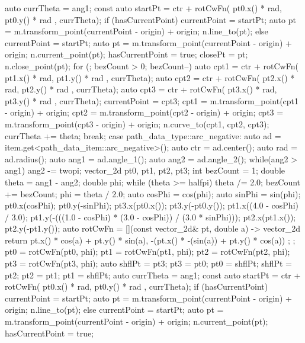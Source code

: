 \begin{codeblock}
{{{    auto currTheta = ang1;
    const auto startPt =
      ctr + rotCwFn({ pt0.x() * rad, pt0.y() * rad }, currTheta);
    if (hasCurrentPoint) {
      currentPoint = startPt;
      auto pt = m.transform_point(currentPoint - origin) + origin;
      n.line_to(pt);
    }
    else {
      currentPoint = startPt;
      auto pt = m.transform_point(currentPoint - origin) + origin;
      n.current_point(pt);
      hasCurrentPoint = true;
      closePt = pt;
      n.close_point(pt);
    }
    for (; bezCount > 0; bezCount--) {
      auto cpt1 = ctr + rotCwFn({ pt1.x() * rad, pt1.y() * rad }, currTheta);
      auto cpt2 = ctr + rotCwFn({ pt2.x() * rad, pt2.y() * rad }, currTheta);
      auto cpt3 = ctr + rotCwFn({ pt3.x() * rad, pt3.y() * rad }, currTheta);
      currentPoint = cpt3;
      cpt1 = m.transform_point(cpt1 - origin) + origin;
      cpt2 = m.transform_point(cpt2 - origin) + origin;
      cpt3 = m.transform_point(cpt3 - origin) + origin;
      n.curve_to(cpt1, cpt2, cpt3);
      currTheta += theta;
    }
  } break;
  case path_data_type::arc_negative:
  {
    auto ad = item.get<path_data_item::arc_negative>();
    auto ctr = ad.center();
    auto rad = ad.radius();
    auto ang1 = ad.angle_1();
    auto ang2 = ad.angle_2();
    while(ang2 > ang1) {
      ang2 -= twopi;
    }
    vector_2d pt0, pt1, pt2, pt3;
    int bezCount = 1;
    double theta = ang1 - ang2;
    double phi;
    while (theta >= halfpi) {
      theta /= 2.0;
      bezCount += bezCount;
    }
    phi = theta / 2.0;
    auto cosPhi = cos(phi);
    auto sinPhi = sin(phi);
    pt0.x(cosPhi);
    pt0.y(-sinPhi);
    pt3.x(pt0.x());
    pt3.y(-pt0.y());
    pt1.x((4.0 - cosPhi) / 3.0);
    pt1.y(-(((1.0 - cosPhi) * (3.0 - cosPhi)) / (3.0 * sinPhi)));
    pt2.x(pt1.x());
    pt2.y(-pt1.y());
    auto rotCwFn = [](const vector_2d& pt, double a) -> vector_2d {
      return { pt.x() * cos(a) + pt.y() * sin(a),
        -(pt.x() * -(sin(a)) + pt.y() * cos(a)) };
    };
    pt0 = rotCwFn(pt0, phi);
    pt1 = rotCwFn(pt1, phi);
    pt2 = rotCwFn(pt2, phi);
    pt3 = rotCwFn(pt3, phi);
    auto shflPt = pt3;
    pt3 = pt0;
    pt0 = shflPt;
    shflPt = pt2;
    pt2 = pt1;
    pt1 = shflPt;
    auto currTheta = ang1;
    const auto startPt =
      ctr + rotCwFn({ pt0.x() * rad, pt0.y() * rad }, currTheta);
    if (hasCurrentPoint) {
      currentPoint = startPt;
      auto pt = m.transform_point(currentPoint - origin) + origin;
      n.line_to(pt);
    }
    else {
      currentPoint = startPt;
      auto pt = m.transform_point(currentPoint - origin) + origin;
      n.current_point(pt);
      hasCurrentPoint = true;
}}}}
\end{codeblock}
